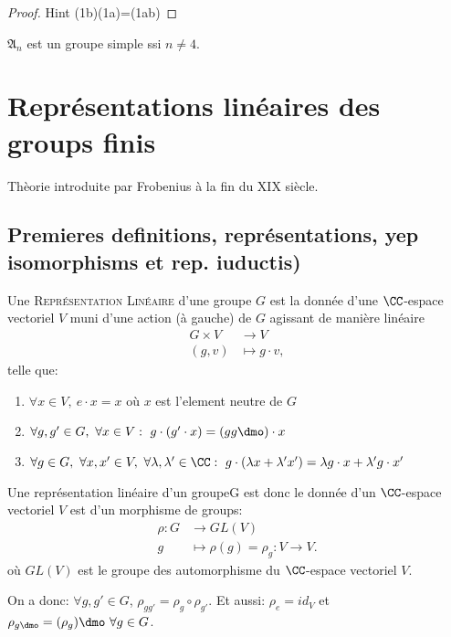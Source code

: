 \begin{proof}
	Hint (1b)(1a)=(1ab)
\end{proof}

\begin{theorem}[Galois]
	$\mathfrak{A}_n$ est un groupe simple ssi $n\neq 4$.
\end{theorem}

\chapter{Représentations linéaires des groups finis}

Thèorie introduite par Frobenius à la fin du XIX siècle.

\section{Premieres definitions, représentations, yep isomorphisms et rep. iuductis)} %
\label{sec:premieres_definitions_représentations_yep_isomorphisms_et_rep_iuductis}

\begin{definition}
	Une \textsc{Représentation Linéaire} d'une groupe $G$ est la donnée d'une $\CC$-espace vectoriel $V$ muni d'une action (à gauche) de $G$ agissant de manière linéaire
	\begin{align*}
		G\times V & \rightarrow V \\
		(g,v) & \mapsto g\cdot v,		
	\end{align*}
	telle que:
	\begin{enumerate}
		\item $\forall x\in V,\ e\cdot x=x$ où $x$ est l'element neutre de $G$
		\item $\forall g, g' \in G,\ \forall x\in V:\ g\cdot (g'\cdot x)=(gg\dmo)\cdot x$
		\item $\forall g\in G,\ \forall x,x'\in V,\ \forall \lambda,\lambda'\in\CC:\ g\cdot(\lambda x+\lambda'x')=\lambda g\cdot x+\lambda' g\cdot x'$
	\end{enumerate}
\end{definition}

\begin{definition}
Une représentation linéaire d'un groupeG est donc le donnée d'un $\CC$-espace vectoriel $V$ est d'un morphisme de groups:
\begin{align*}
	\rho:G &\rightarrow GL(V)\\
	g &\mapsto \rho(g)=\rho_g:V\rightarrow V.	
\end{align*}                
où $GL(V)$ est le groupe des automorphisme du $\CC$-espace vectoriel $V$.

On a donc: $\forall g,g'\in G$, $\rho_{gg'}=\rho_g\circ \rho_{g'}$. Et aussi: $\rho_e=id_V$ et $\rho_{g\dmo}=(\rho_g)\dmo\ \forall g\in G$.
\end{definition}

